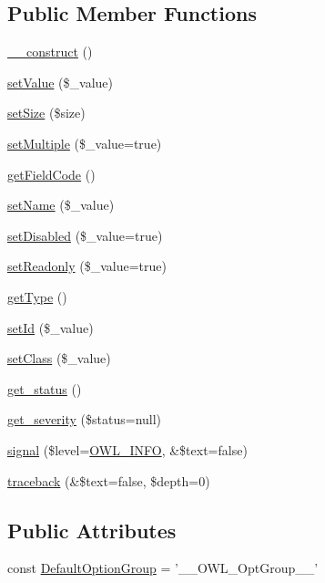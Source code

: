 \subsection*{Public Member Functions}
\begin{DoxyCompactItemize}
\item 
\hyperlink{classFormFieldSelect_a32c59192be8c316fb2f7e1edde8f0a98}{\_\-\_\-construct} ()
\item 
\hyperlink{classFormFieldSelect_ae69f5b352df63796c048dca6a2de7544}{setValue} (\$\_\-value)
\item 
\hyperlink{classFormFieldSelect_ad8ae8dcf6f6763cb32966eeca33c472b}{setSize} (\$size)
\item 
\hyperlink{classFormFieldSelect_aa69374c1f0692d691e7899f3ed14a42e}{setMultiple} (\$\_\-value=true)
\item 
\hyperlink{classFormFieldSelect_ae8875a609d388b03fcc63dd9111b5458}{getFieldCode} ()
\item 
\hyperlink{classFormField_ad57e32bd53170af060e869b3b60f0ef7}{setName} (\$\_\-value)
\item 
\hyperlink{classFormField_a9fa2c828eaf98154edfaa2e755657117}{setDisabled} (\$\_\-value=true)
\item 
\hyperlink{classFormField_a6eabbb35d24b1698ea25b66ddfd88a64}{setReadonly} (\$\_\-value=true)
\item 
\hyperlink{classFormField_a1f64b737bccb6b2827f8c5665b9920c7}{getType} ()
\item 
\hyperlink{classBaseElement_a0c1ce3d1684ecb78960cf7a97278494e}{setId} (\$\_\-value)
\item 
\hyperlink{classBaseElement_af6597b30fa9798878f6290271043dfa2}{setClass} (\$\_\-value)
\item 
\hyperlink{class__OWL_a99ec771fa2c5c279f80152cc09e489a8}{get\_\-status} ()
\item 
\hyperlink{class__OWL_adf9509ef96858be7bdd9414c5ef129aa}{get\_\-severity} (\$status=null)
\item 
\hyperlink{class__OWL_a51ba4a16409acf2a2f61f286939091a5}{signal} (\$level=\hyperlink{owl_8severitycodes_8php_a139328861128689f2f4def6a399d9057}{OWL\_\-INFO}, \&\$text=false)
\item 
\hyperlink{class__OWL_aa29547995d6741b7d2b90c1d4ea99a13}{traceback} (\&\$text=false, \$depth=0)
\end{DoxyCompactItemize}
\subsection*{Public Attributes}
\begin{DoxyCompactItemize}
\item 
const \hyperlink{classFormFieldSelect_a9f90f3ec8f40d0a3ac6b75194ab7415f}{DefaultOptionGroup} = '\_\-\_\-OWL\_\-OptGroup\_\-\_\-'
\end{DoxyCompactItemize}
